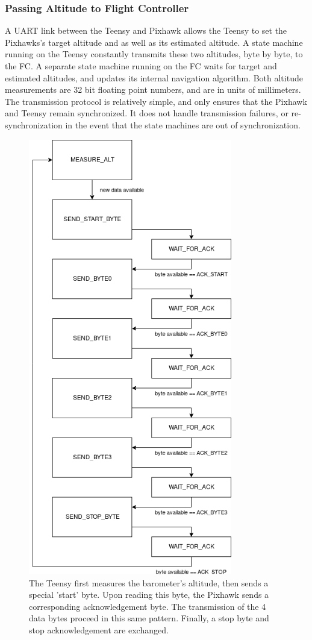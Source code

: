 \documentclass[12pt,journal,compsoc]{IEEEtran}
\begin{document}
\subsubsection{Passing Altitude to Flight Controller}
A UART link between the Teensy and Pixhawk allows the Teensy to set the Pixhawks's target altitude and as well as its estimated altitude. A state machine running on the Teensy constantly transmits these two altitudes, byte by byte, to the FC. A separate state machine running on the FC waits for target and estimated altitudes, and updates its internal navigation algorithm. Both altitude measurements are 32 bit floating point numbers, and are in units of millimeters. The transmission protocol is relatively simple, and only ensures that the Pixhawk and Teensy remain synchronized. It does not handle transmission failures, or re-synchronization in the event that the state machines are out of synchronization. 

\begin{figure}[h!]
\hspace*{0cm}
\centering
\includegraphics[width=3.5in]{altitude_transmission_state_machine.png}
\caption{The Teensy first measures the barometer's altitude, then sends a special 'start' byte. Upon reading this byte, the Pixhawk sends a corresponding acknowledgement byte. The transmission of the 4 data bytes proceed in this same pattern. Finally, a stop byte and stop acknowledgement are exchanged.} 
\end{figure}
\end{document}
